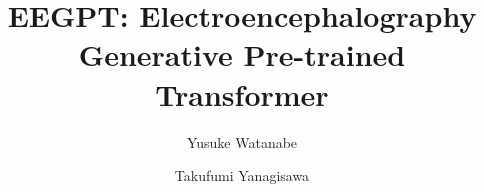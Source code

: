 \documentclass[final,3p,times,twocolumn]{elsarticle}
\begin{document}
\begin{frontmatter}
\begin{highlights}






\end{highlights}\title{
EEGPT: Electroencephalography Generative Pre-trained Transformer
}\author[1,2]{Yusuke Watanabe}
\author[1,3]{Takufumi Yanagisawa}

\address[1]{Institute for Advanced Cocreation studies, Osaka University, 2-2 Yamadaoka, Suita, 565-0871, Osaka, Japan}

\address[2]{Department of Biomeidcal Engineering, The University of Melbourne, Grattan Street, Parkville, Victoria, 3010, Australia}

\address[3]{Department of Neurosurgery, Osaka University Graduate School of Medicine, 2-2 Yamadaoka, Osaka, 565-0871, Japan}


\end{frontmatter}
\end{document}
